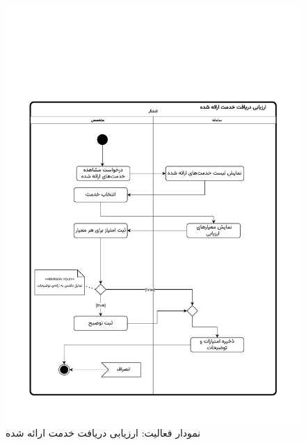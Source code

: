 \begin{figure}[ht!]
	\centering
	\includegraphics[scale=0.8, page=1]{figs/OOD-activity-evaluatereqsent.pdf}
	\caption{نمودار فعالیت: ارزیابی دریافت خدمت ارائه شده}
\end{figure}
\FloatBarrier
\newpage

